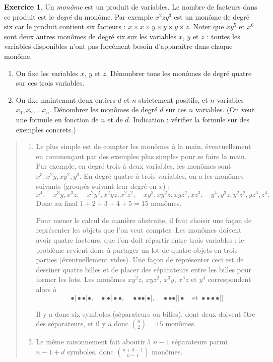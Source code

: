 \documentclass[11pt]{article}
\theoremstyle{definition}
\newtheorem{exo}{Exercice}
\newenvironment{solution}{\begin{quote}\color{teal}}{\end{quote}}
\begin{document}
\begin{exo}
Un \emph{monôme} est un produit de variables. Le nombre de facteurs dans ce produit est le \emph{degré} du monôme.
Par exemple $x^2zy^3$ est un monôme de degré six car le produit contient six facteurs : $x\times x\times y\times y\times y \times z$. Noter que $xy^5$ et $x^6$ sont deux autres monômes de degré six sur les variables $x$, $y$ et $z$ : toutes les variables disponibles n'ont pas forcément besoin d'apparaître dans chaque monôme.
\begin{enumerate}
\item On fixe les variables $x$, $y$ et $z$. Dénombrer tous les monômes de degré quatre sur ces trois variables.
\item On fixe maintenant deux entiers $d$ et $n$ strictement positifs, et $n$ variables $x_1, x_2, \dots x_n$. Dénombrer les monômes de degré $d$ sur ces $n$ variables. (On veut une formule en fonction de $n$ et de $d$. Indication : vérifier la formule sur des exemples concrets.)
\end{enumerate}

\begin{solution}
\begin{enumerate}
\item Le plus simple est de compter les monômes à la main, éventuellement en commençant par des exemples plus simples pour se faire la main. Par exemple, en degré trois à deux variables, les monômes sont $x^3, x^2y, xy^2, y^3$. En degré quatre à trois variables, on a les monômes suivants (groupés suivant leur degré en $x$) :
\[
x^4,\quad x^3y, x^3z, \quad
x^2y^2, x^2yz, x^2z^2,\quad
xy^3, xy^2z,xyz^2,xz^3,\quad
y^4,y^3z,y^2z^2,yz^3,z^4.
\]
Donc au final $1+2+3+4+5=15$ monômes.

Pour mener le calcul de manière abstraite, il faut choisir une façon de représenter les objets que l'on veut compter. Les monômes doivent avoir quatre facteurs, que l'on doit répartir entre trois variables : le problème revient donc à partager un lot de quatre objets en trois parties (éventuellement vides). Une façon de représenter ceci est de dessiner quatre billes et de placer des séparateurs entre les billes pour former les lots. Les monômes $xy^2z$, $xyz^2$, $x^3y$, $x^3z$ et $y^4$ correspondent alors à
\[ \bullet \vert \bullet \bullet \vert \bullet,\quad
\bullet \vert \bullet \vert \bullet \bullet, \quad 
\bullet \bullet \bullet \vert\bullet\vert, \quad 
\bullet \bullet \bullet \vert \vert \bullet \quad\text{et } 
\bullet \bullet \bullet  \bullet \vert \vert
\]

Il y a donc six symboles (séparateurs ou billes), dont deux doivent être des séparateurs, et il y a donc $\binom{6}{2}=15$ monômes.
\item Le même raisonnement fait aboutir à $n-1$ séparateurs parmi $n-1+d$ symboles, donc $\binom{n+d-1}{n-1}$ monômes.
\end{enumerate}
\end{solution}
\end{exo}
\end{document}
